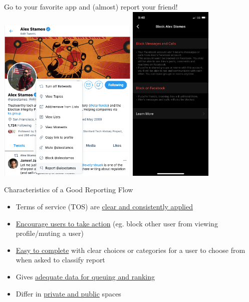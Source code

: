 \documentclass[nobackground,dvipsnames,table,aspectratio=169]{beamer}
\begin{document}
\begin{frame}{Go to your favorite app and (almost) report your friend!}
    \includegraphics[width=0.5\textwidth]{block-alex-stamos-1}
    \includegraphics[width=0.3\textwidth]{block-alex-stamos-2}
\end{frame}

\begin{frame}{Characteristics of a Good Reporting Flow}
    \begin{itemize}
        \item Terms of service (TOS) are \underline{clear and consistently applied}
        \item \underline{Encourage users to take action} (eg. block other user from viewing profile/muting a user)
        \item \underline{Easy to complete} with clear choices or categories for a user to choose from when asked to classify report
        \item Gives \underline{adequate data for queuing and ranking}
        \item Differ in \underline{private and public} spaces
    \end{itemize}
\end{frame}
\end{document}
